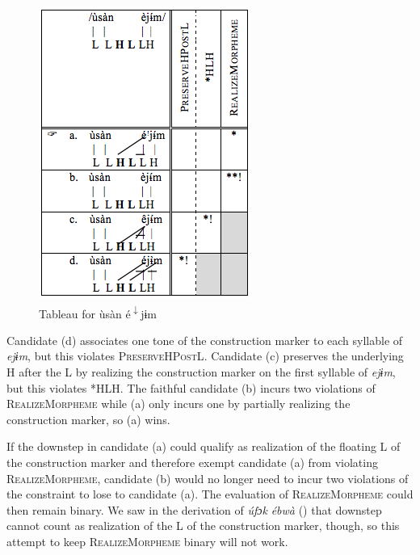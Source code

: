 \documentclass[output=paper]{langscibook}
\begin{document}
  
\begin{figure}
\includegraphics[width=\textwidth]{figures/glewwe-img7.png}
\caption{Tableau for \textup{ùsàn é}\textup{\textsuperscript{$\downarrow$}}\textup{jɨm}}
\label{fig:glewwe:8}
\end{figure}

Candidate (d) associates one tone of the construction marker to each syllable of \textit{ejɨm}, but this violates \textsc{PreserveHPostL}. Candidate (c) preserves the underlying H after the L by realizing the construction marker on the first syllable of \textit{ejɨm}, but this violates *HLH. The faithful candidate (b) incurs two violations of \textsc{RealizeMorpheme} while (a) only incurs one by partially realizing the construction marker, so (a) wins. 

If the downstep in candidate (a) could qualify as realization of the floating L of the construction marker and therefore exempt candidate (a) from violating \textsc{RealizeMorpheme,} candidate (b) would no longer need to incur two violations of the constraint to lose to candidate (a). The evaluation of \textsc{RealizeMorpheme} could then remain binary. We saw in the derivation of \textit{úfɔk} \textit{ébwà} () that downstep cannot count as realization of the L of the construction marker, though, so this attempt to keep \textsc{RealizeMorpheme} binary will not work.   
\end{document}
